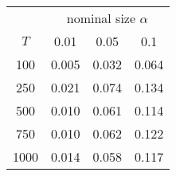 % 
\begin{tabular}{cccc}
  \hline
  & \multicolumn{3}{c}{nominal size $\alpha$} \\
 $T$ & 0.01 & 0.05 & 0.1 \\
 \hline
100 & 0.005 & 0.032 & 0.064 \\ 
  250 & 0.021 & 0.074 & 0.134 \\ 
  500 & 0.010 & 0.061 & 0.114 \\ 
  750 & 0.010 & 0.062 & 0.122 \\ 
  1000 & 0.014 & 0.058 & 0.117 \\ 
   \hline
\end{tabular}
